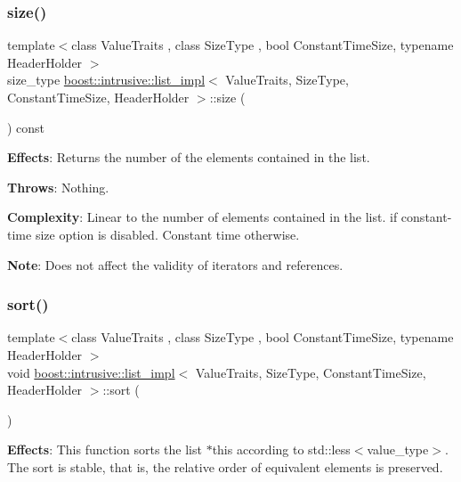 \subsubsection{\texorpdfstring{size()}{size()}}
{\footnotesize\ttfamily template$<$class Value\+Traits , class Size\+Type , bool Constant\+Time\+Size, typename Header\+Holder $>$ \\
size\+\_\+type \hyperlink{classboost_1_1intrusive_1_1list__impl}{boost\+::intrusive\+::list\+\_\+impl}$<$ Value\+Traits, Size\+Type, Constant\+Time\+Size, Header\+Holder $>$\+::size (\begin{DoxyParamCaption}{ }\end{DoxyParamCaption}) const\hspace{0.3cm}{\ttfamily [inline]}}

{\bfseries Effects}\+: Returns the number of the elements contained in the list.

{\bfseries Throws}\+: Nothing.

{\bfseries Complexity}\+: Linear to the number of elements contained in the list. if constant-\/time size option is disabled. Constant time otherwise.

{\bfseries Note}\+: Does not affect the validity of iterators and references. \mbox{\label{classboost_1_1intrusive_1_1list__impl_abc510cb71270fe4ee9e5f8c7ba8e3aa0}} 
\subsubsection{\texorpdfstring{sort()}{sort()}\hspace{0.1cm}{\footnotesize\ttfamily [1/2]}}
{\footnotesize\ttfamily template$<$class Value\+Traits , class Size\+Type , bool Constant\+Time\+Size, typename Header\+Holder $>$ \\
void \hyperlink{classboost_1_1intrusive_1_1list__impl}{boost\+::intrusive\+::list\+\_\+impl}$<$ Value\+Traits, Size\+Type, Constant\+Time\+Size, Header\+Holder $>$\+::sort (\begin{DoxyParamCaption}{ }\end{DoxyParamCaption})\hspace{0.3cm}{\ttfamily [inline]}}

{\bfseries Effects}\+: This function sorts the list $\ast$this according to std\+::less$<$value\+\_\+type$>$. The sort is stable, that is, the relative order of equivalent elements is preserved.

